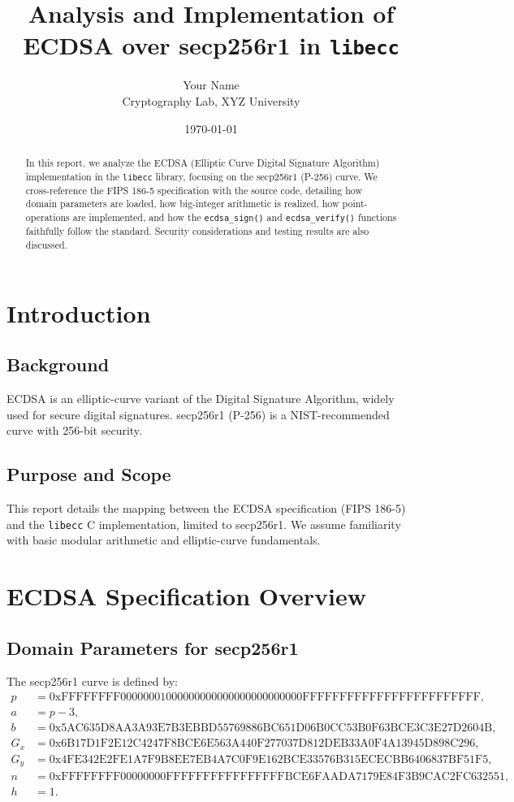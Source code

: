 \documentclass[12pt,a4paper]{article}
\title{Analysis and Implementation of ECDSA over secp256r1 in \texttt{libecc}}
\author{Your Name\\Cryptography Lab, XYZ University}
\date{\today}
\begin{document}
	\maketitle
	
	\begin{abstract}
		In this report, we analyze the ECDSA (Elliptic Curve Digital Signature Algorithm) implementation in the \texttt{libecc} library, focusing on the secp256r1 (P-256) curve. We cross-reference the FIPS 186-5 specification with the source code, detailing how domain parameters are loaded, how big-integer arithmetic is realized, how point-operations are implemented, and how the \texttt{ecdsa\_sign()} and \texttt{ecdsa\_verify()} functions faithfully follow the standard. Security considerations and testing results are also discussed.
	\end{abstract}
	
	\tableofcontents
	\newpage
	
	\section{Introduction}
	\subsection{Background}
	ECDSA is an elliptic-curve variant of the Digital Signature Algorithm, widely used for secure digital signatures. secp256r1 (P-256) is a NIST-recommended curve with 256-bit security.
	
	\subsection{Purpose and Scope}
	This report details the mapping between the ECDSA specification (FIPS 186-5) and the \texttt{libecc} C implementation, limited to secp256r1. We assume familiarity with basic modular arithmetic and elliptic-curve fundamentals.
	
	\section{ECDSA Specification Overview}
	\subsection{Domain Parameters for secp256r1}
	The secp256r1 curve is defined by:
	\begin{align*}
		p &= \text{0xFFFFFFFF00000001000000000000000000000000FFFFFFFFFFFFFFFFFFFFFFFF},\\
		a &= p - 3,\\
		b &= \text{0x5AC635D8AA3A93E7B3EBBD55769886BC651D06B0CC53B0F63BCE3C3E27D2604B},\\
		G_x &= \text{0x6B17D1F2E12C4247F8BCE6E563A440F277037D812DEB33A0F4A13945D898C296},\\
		G_y &= \text{0x4FE342E2FE1A7F9B8EE7EB4A7C0F9E162BCE33576B315ECECBB6406837BF51F5},\\
		n &= \text{0xFFFFFFFF00000000FFFFFFFFFFFFFFFFBCE6FAADA7179E84F3B9CAC2FC632551},\\
		h &= 1.
	\end{align*}
	
\end{document}
